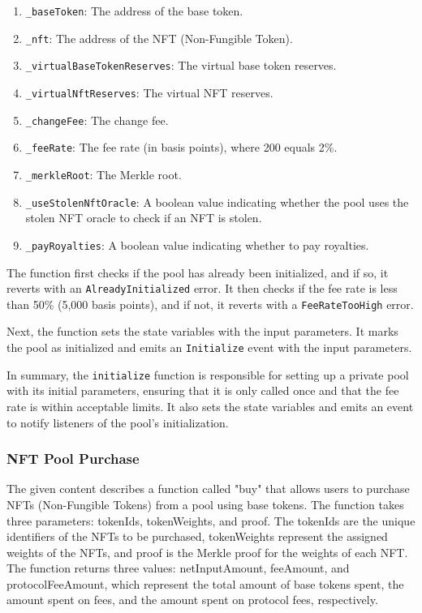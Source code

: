 \begin{enumerate}
\def\labelenumi{\arabic{enumi}.}
\tightlist
\item
  \texttt{\_baseToken}: The address of the base token.
\item
  \texttt{\_nft}: The address of the NFT (Non-Fungible Token).
\item
  \texttt{\_virtualBaseTokenReserves}: The virtual base token reserves.
\item
  \texttt{\_virtualNftReserves}: The virtual NFT reserves.
\item
  \texttt{\_changeFee}: The change fee.
\item
  \texttt{\_feeRate}: The fee rate (in basis points), where 200 equals
  2\%.
\item
  \texttt{\_merkleRoot}: The Merkle root.
\item
  \texttt{\_useStolenNftOracle}: A boolean value indicating whether the
  pool uses the stolen NFT oracle to check if an NFT is stolen.
\item
  \texttt{\_payRoyalties}: A boolean value indicating whether to pay
  royalties.
\end{enumerate}

The function first checks if the pool has already been initialized, and
if so, it reverts with an \texttt{AlreadyInitialized} error. It then
checks if the fee rate is less than 50\% (5,000 basis points), and if
not, it reverts with a \texttt{FeeRateTooHigh} error.

Next, the function sets the state variables with the input parameters.
It marks the pool as initialized and emits an \texttt{Initialize} event
with the input parameters.

In summary, the \texttt{initialize} function is responsible for setting
up a private pool with its initial parameters, ensuring that it is only
called once and that the fee rate is within acceptable limits. It also
sets the state variables and emits an event to notify listeners of the
pool's initialization.

\hypertarget{nft-pool-purchase}{%
\subsubsection{NFT Pool Purchase}\label{nft-pool-purchase}}

The given content describes a function called "buy" that allows users to
purchase NFTs (Non-Fungible Tokens) from a pool using base tokens. The
function takes three parameters: tokenIds, tokenWeights, and proof. The
tokenIds are the unique identifiers of the NFTs to be purchased,
tokenWeights represent the assigned weights of the NFTs, and proof is
the Merkle proof for the weights of each NFT. The function returns three
values: netInputAmount, feeAmount, and protocolFeeAmount, which
represent the total amount of base tokens spent, the amount spent on
fees, and the amount spent on protocol fees, respectively.

